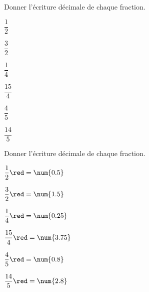 \begin{exercice*}
    Donner l'écriture décimale de chaque fraction.
    \begin{multicols}{3}        
        \begin{enumerate}
            \begin{spacing}{1.5}
                \item $\dfrac{1}{2}$
                \item $\dfrac{3}{2}$
                \item $\dfrac{1}{4}$
                \item $\dfrac{15}{4}$
                \item $\dfrac{4}{5}$
                \item $\dfrac{14}{5}$              
            \end{spacing}
        \end{enumerate}         
    \end{multicols}
\end{exercice*}
\begin{corrige}
    Donner l'écriture décimale de chaque fraction.
    \begin{multicols}{3}        
        \begin{enumerate}
            \begin{spacing}{1.5}
                \item $\dfrac{1}{2} {\red = \num{0.5}}$
                \item $\dfrac{3}{2} {\red = \num{1.5}}$
                \item $\dfrac{1}{4} {\red = \num{0.25}}$
                \item $\dfrac{15}{4}{\red = \num{3.75}}$
                \item $\dfrac{4}{5} {\red = \num{0.8}}$
                \item $\dfrac{14}{5}{\red = \num{2.8}}$
            \end{spacing}
        \end{enumerate}        
    \end{multicols}
\end{corrige}

